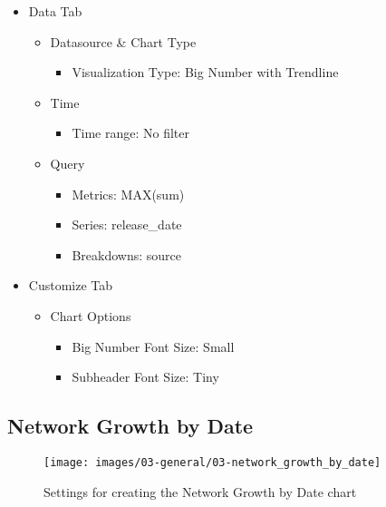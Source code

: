 \documentclass[
]{book}
\providecommand{\tightlist}{%
  \setlength{\itemsep}{0pt}\setlength{\parskip}{0pt}}
\begin{document}
\begin{itemize}
\tightlist
\item
  Data Tab

  \begin{itemize}
  \tightlist
  \item
    Datasource \& Chart Type

    \begin{itemize}
    \tightlist
    \item
      Visualization Type: Big Number with Trendline
    \end{itemize}
  \item
    Time

    \begin{itemize}
    \tightlist
    \item
      Time range: No filter
    \end{itemize}
  \item
    Query

    \begin{itemize}
    \tightlist
    \item
      Metrics: MAX(sum)
    \item
      Series: release\_date
    \item
      Breakdowns: source
    \end{itemize}
  \end{itemize}
\item
  Customize Tab

  \begin{itemize}
  \tightlist
  \item
    Chart Options

    \begin{itemize}
    \tightlist
    \item
      Big Number Font Size: Small
    \item
      Subheader Font Size: Tiny
    \end{itemize}
  \end{itemize}
\end{itemize}

\hypertarget{network-growth-by-date}{%
\subsection*{Network Growth by Date}\label{network-growth-by-date}}

\begin{figure}
\texttt{[image: images/03-general/03-network\_growth\_by\_date]} \caption{Settings for creating the Network Growth by Date chart}\label{fig:networkGrowthByDate}
\end{figure}
\end{document}
